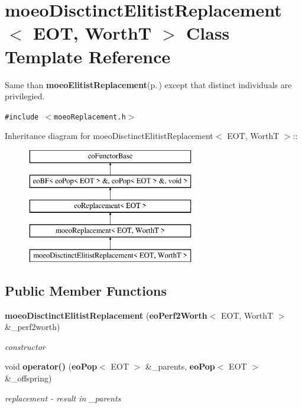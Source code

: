 \section{moeo\-Disctinct\-Elitist\-Replacement$<$ EOT, Worth\-T $>$ Class Template Reference}
\label{classmoeoDisctinctElitistReplacement}
Same than {\bf moeo\-Elitist\-Replacement}{\rm (p.\,\pageref{classmoeoElitistReplacement})} except that distinct individuals are privilegied.  


{\tt \#include $<$moeo\-Replacement.h$>$}

Inheritance diagram for moeo\-Disctinct\-Elitist\-Replacement$<$ EOT, Worth\-T $>$::\begin{figure}[H]
\begin{center}
\leavevmode
\includegraphics[height=5cm]{classmoeoDisctinctElitistReplacement}
\end{center}
\end{figure}
\subsection*{Public Member Functions}
\begin{CompactItemize}
\item 
{\bf moeo\-Disctinct\-Elitist\-Replacement} ({\bf eo\-Perf2Worth}$<$ EOT, Worth\-T $>$ \&\_\-perf2worth)
\begin{CompactList}\small\item\em constructor \item\end{CompactList}\item 
void {\bf operator()} ({\bf eo\-Pop}$<$ EOT $>$ \&\_\-parents, {\bf eo\-Pop}$<$ EOT $>$ \&\_\-offspring)
\begin{CompactList}\small\item\em replacement - result in \_\-parents \item\end{CompactList}\end{CompactItemize}
